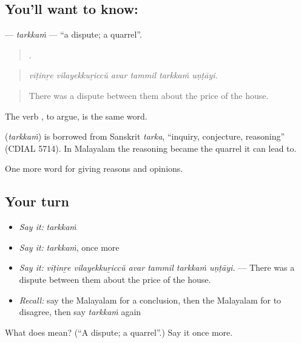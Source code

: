 \subsection*{You'll want to know: }
\textbf{} — \emph{tarkkaṁ} — \textquotedblleft{}a dispute; a quarrel\textquotedblright{}.

\begin{quote}
     .
\end{quote}

\begin{quote}
\emph{vīṭinṟe vilayekkuṟiccŭ avar tammil tarkkaṁ uṇṭāyi.}
\end{quote}

\begin{quote}
There was a dispute between them about the price of the house.
\end{quote}

The verb , to argue, is the same word.

\begin{cousinweb}
\textbf{} (\emph{tarkkaṁ}) is borrowed from Sanskrit \emph{tarka}, \textquotedblleft{}inquiry, conjecture, reasoning\textquotedblright{} (CDIAL 5714). In Malayalam the reasoning became the quarrel it can lead to.
\end{cousinweb}

\begin{grammarlens}[title={What you've built}]
One more word for giving reasons and opinions.
\end{grammarlens}

\subsection*{Your turn}
\begin{itemize}
\raggedright
  \item \emph{Say it:} \emph{tarkkaṁ}
  \item \emph{Say it:} \emph{tarkkaṁ}, once more
  \item \emph{Say it:} \emph{vīṭinṟe vilayekkuṟiccŭ avar tammil tarkkaṁ uṇṭāyi.} — There was a dispute between them about the price of the house.
  \item \emph{Recall:} say the Malayalam for a conclusion, then the Malayalam for to disagree, then say \emph{tarkkaṁ} again
\end{itemize}

\begin{tcolorbox}[breakable,colback=teal!4,colframe=teal!35!black,title={Before you move on}]
What does  mean? (\textquotedblleft{}A dispute; a quarrel\textquotedblright{}.) Say it once more.
\end{tcolorbox}

